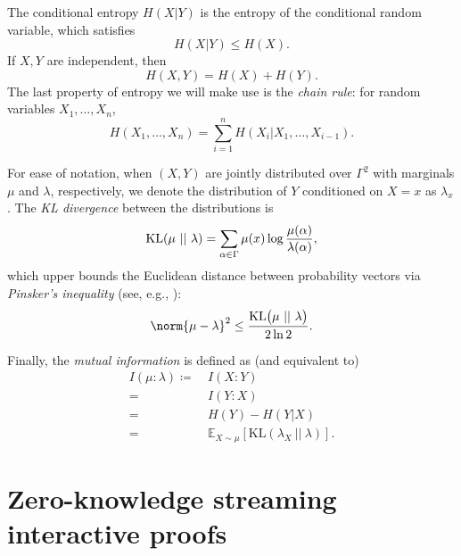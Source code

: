 \documentclass[10pt,a4paper]{article}
\theoremstyle{definition}
\newcommand{\E}{\mathbb E}
\newcommand{\alphabet}{\Gamma}
\def\symbol#1{
    \ifnum#1=1
        \alpha
    \else
    \ifnum#1=2
        \beta
    \else
    \ifnum#1=3
        \gamma
    \fi\fi\fi
}
\begin{document}
    The conditional entropy $H(X|Y)$ is the entropy of the conditional random variable, which satisfies
    \begin{equation}
    \label{eq:entropy-conditioning}
        H(X|Y) \leq H(X).
    \end{equation}
    If $X,Y$ are independent, then
    \begin{equation}
    \label{eq:entropy-independence}
        H(X,Y) = H(X) + H(Y).
    \end{equation}
    The last property of entropy we will make use is the \emph{chain rule}: for random variables $X_1, \ldots, X_n$,
    \begin{equation}
        \label{eq:chain-rule-entropy}
        H(X_1, \ldots, X_n) = \sum_{i = 1}^n H(X_i|X_1, \ldots, X_{i-1}).
    \end{equation}

    For ease of notation, when $(X, Y)$ are jointly distributed over $\alphabet^2$ with marginals $\mu$ and $\lambda$, respectively, we denote the distribution of $Y$ conditioned on $X = x$ as $\lambda_x$. The \emph{KL divergence} between the distributions is
    \begin{equation}
        \label{eq:kl-divergence}
        \mathrm{KL}(\mu ~||~ \lambda) = \sum_{\symbol1 \in \alphabet} \mu(x) \log \frac{\mu(\symbol1)}{\lambda(\symbol1)},
    \end{equation}
    which upper bounds the Euclidean distance between probability vectors via \emph{Pinsker's inequality} (see, e.g., \cite{BLM13}):
    \begin{equation}
    \label{eq:pinsker}
    \norm{\mu - \lambda}^2 \leq \frac{\mathrm{KL}\big(\mu ~||~ \lambda\big)}{2 \ln 2}.
\end{equation}
    
    Finally, the \emph{mutual information} is defined as (and equivalent to)
    \begin{align}
        \label{eq:mutual-information}
        I(\mu:\lambda) \coloneqq&~ I(X:Y)\\
        =&~ I(Y:X) \nonumber\\
        =&~ H(Y) - H(Y|X) \nonumber\\
        =&~ \E_{X \sim \mu}[\mathrm{KL}(\lambda_X ~||~ \lambda)] \nonumber.
    \end{align}


\section{Zero-knowledge streaming interactive proofs}
\label{sec:streaming-zk}
\end{document}
